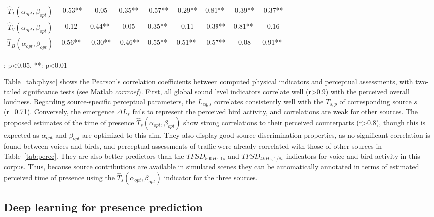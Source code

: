 \documentclass[twocolumn]{article}
\begin{document}
\begin{table}[ht!]
\begin{threeparttable}[t]
\begin{tabular}{ c | c c c c c | c c c c }
	$\hat T_T(\alpha_{opt}, \beta_{opt})$ & -0.53** & -0.05 & 0.35** & -0.57** & -0.29** & 0.81** & -0.39** & -0.37** \\
	$\hat T_V(\alpha_{opt}, \beta_{opt})$ & 0.12 & 0.44** & 0.05 & 0.35** & -0.11 & -0.39** & 0.81** & -0.16 \\
	$\hat T_B(\alpha_{opt}, \beta_{opt})$ & 0.56** & -0.30** & -0.46** & 0.55** & 0.51** & -0.57** & -0.08 & 0.91** \\ \hline
\end{tabular}
\begin{tablenotes}
\item *: p<0.05, **: p<0.01
\end{tablenotes}
\end{threeparttable}
\end{table}

Table~\ref{tab:physc} shows the Pearson's correlation coefficients between computed physical indicators and perceptual assessments, with two-tailed significance tests (see Matlab \textit{corrcoef}). First, all global sound level indicators correlate well (r>0.9) with the perceived overall loudness. Regarding source-specific perceptual parameters, the $L_{eq, s}$ correlates consistently well with the $T_{s, p}$ of corresponding source $s$ (r=0.71). Conversely, the emergence $\Delta L_s$ fails to represent the perceived bird activity, and correlations are weak for other sources. The proposed estimates of the time of presence $\hat T_s(\alpha_{opt}, \beta_{opt})$ show strong correlations to their perceived counterparts (r>0.8), though this is expected as $\alpha_{opt}$ and $\beta_{opt}$ are optimized to this aim. They also display good source discrimination properties, as no significant correlation is found between voices and birds, and perceptual assessments of traffic were already correlated with those of other sources in Table~\ref{tab:percc}. They are also better predictors than the $TFSD_{500Hz, 1s}$ and $TFSD_{4kHz, 1/8s}$ indicators for voice and bird activity in this corpus. Thus, because source contributions are available in simulated scenes they can be automatically annotated in terms of estimated perceived time of presence using the $\hat T_s(\alpha_{opt}, \beta_{opt})$ indicator for the three sources.


\subsection{Deep learning for presence prediction}
\label{sec:pred_deep}
\end{document}
